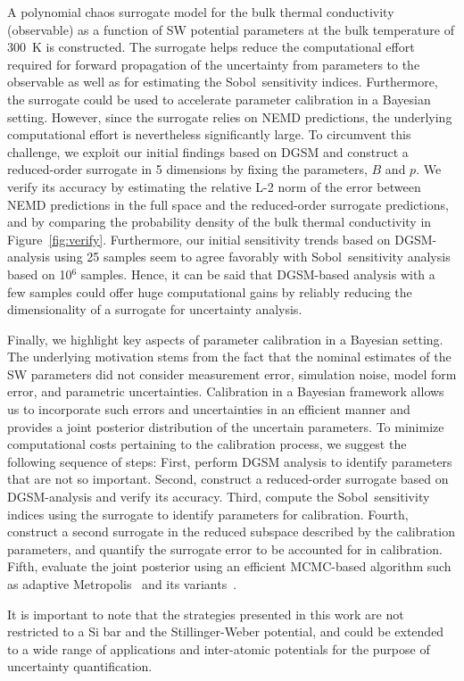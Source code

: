 A polynomial chaos surrogate model for the bulk thermal conductivity (observable)
as a function of SW potential
parameters at the bulk temperature of 300~K is constructed. The surrogate helps reduce the
computational effort required for forward propagation of the uncertainty from
parameters to the observable as well as for estimating the Sobol\textquotesingle~sensitivity indices.
Furthermore, the surrogate could be used to accelerate parameter calibration in a
Bayesian setting. However, since the surrogate relies on NEMD predictions, the
underlying computational effort is nevertheless significantly large. To circumvent
this challenge, we exploit our initial findings based on DGSM and construct
a reduced-order surrogate in 5 dimensions by fixing the parameters, $B$ and $p$.
We verify its accuracy by estimating the relative
L-2 norm of the error between NEMD predictions in the full space and the reduced-order
surrogate predictions, and by comparing the probability density of the
bulk thermal conductivity in Figure~\ref{fig:verify}. Furthermore, our initial
sensitivity trends based on DGSM-analysis using 25 samples seem to agree favorably
with Sobol\textquotesingle~sensitivity analysis based on 10$^{6}$ samples. Hence, it can be said
that DGSM-based analysis with a few samples could offer huge computational gains
by reliably reducing the dimensionality of a surrogate for uncertainty analysis. 

Finally, we highlight key aspects of parameter calibration in a Bayesian setting.
The underlying motivation stems from the fact that the nominal estimates of the SW
parameters did not consider measurement error, simulation noise, model form error,
and parametric uncertainties. Calibration in a Bayesian framework allows us to
incorporate such errors and uncertainties in an efficient manner and provides
a joint posterior distribution of the uncertain parameters. To minimize computational
costs pertaining to the calibration process, we suggest the following sequence of
steps: First, perform DGSM analysis to 
identify parameters that are not so important. Second, construct a reduced-order
surrogate based on DGSM-analysis and verify its accuracy. Third, compute the
Sobol\textquotesingle~sensitivity indices using the surrogate to identify parameters for calibration. 
Fourth, construct a second surrogate in the reduced subspace described by the
calibration parameters, and quantify the surrogate error to be accounted for
in calibration. Fifth, evaluate the joint posterior using an efficient MCMC-based algorithm
such as adaptive Metropolis~\cite{Haario:2001} and its variants~\cite{Haario:2006, Green:2001}.

It is important to note that the strategies presented 
in this work are not restricted to a Si bar and the Stillinger-Weber potential, and
could be extended to a wide range of applications and inter-atomic potentials for
the purpose of uncertainty quantification. 

